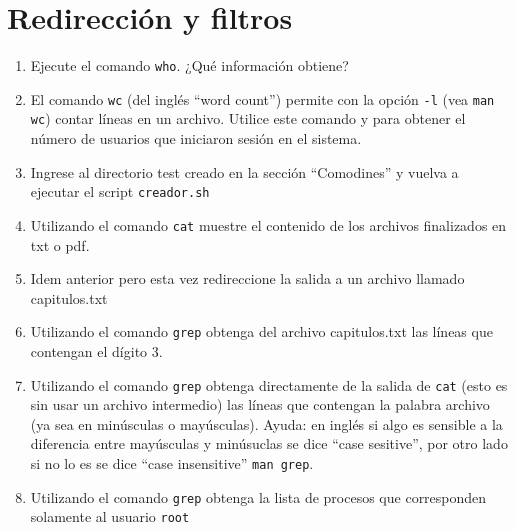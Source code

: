\documentclass[12pt]{article}
\begin{document}
\section*{Redirección y filtros}
\begin{enumerate}
\item Ejecute el comando \texttt{who}. ¿Qué información obtiene?
\item El comando \texttt{wc} (del inglés ``word count'') permite con la opción \texttt{-l}  (vea \texttt{man wc}) contar 
líneas en un archivo. Utilice este comando y \texttt{\textbar} para obtener el número de usuarios que iniciaron 
sesión en el sistema. 
\item Ingrese al directorio test creado en la sección ``Comodines'' y vuelva a ejecutar el script \texttt{creador.sh}
\item Utilizando el comando \texttt{cat} muestre el contenido de los archivos finalizados en txt o pdf. 
\item Idem anterior pero esta vez redireccione la salida a un archivo llamado capitulos.txt
\item Utilizando el comando \texttt{grep} obtenga del archivo capitulos.txt las líneas que contengan el dígito 3. 
\item Utilizando el comando \texttt{grep} obtenga directamente de la salida de \texttt{cat} (esto es sin usar un archivo 
intermedio) las líneas que contengan la palabra archivo (ya sea en minúsculas o mayúsculas). Ayuda: en inglés 
si algo es sensible a la diferencia entre mayúsculas y minúsuclas se dice ``case sesitive'', por otro lado 
si no lo es se dice ``case insensitive'' \texttt{man grep}.  
\item Utilizando el comando \texttt{grep} obtenga la lista de procesos que corresponden solamente al usuario \texttt{root}



\end{enumerate}
\end{document}

